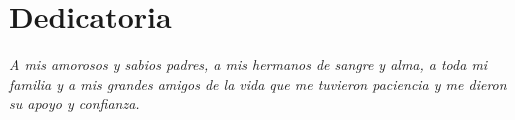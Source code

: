 \clearpage
{}
{}

\chapter*{Dedicatoria}
\begin{flushright}
\vspace{3cm}	
	\textit{A mis amorosos y sabios padres, a mis hermanos de sangre y alma, a toda mi familia y a mis grandes amigos de la vida que me tuvieron paciencia y me dieron su apoyo y confianza.}
\end{flushright}